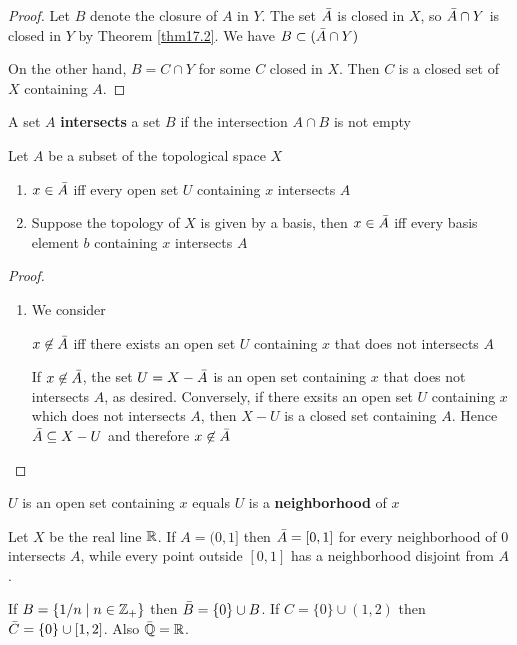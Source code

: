 \documentclass[11pt]{article}
\begin{document}
\begin{proof}
Let \(B\) denote the closure of \(A\) in \(Y\). The set \(\bar{A}\) is closed in \(X\),
so \(\bar{A}\cap Y\) is closed in \(Y\) by Theorem \ref{thm17.2}. We have \(B\subset(\bar{A}\cap Y)\)

On the other hand, \(B=C\cap Y\) for some \(C\) closed in \(X\). Then \(C\) is a closed set of \(X\)
containing \(A\).
\end{proof}

A set \(A\) \textbf{intersects} a set \(B\) if the intersection \(A\cap B\) is not empty

\begin{theorem}[]
\label{thm17.5}
Let \(A\) be a subset of the topological space \(X\)
\begin{enumerate}
\item \(x\in\bar{A}\) iff every open set \(U\) containing \(x\) intersects \(A\)
\item Suppose the topology of \(X\) is given by a basis, then \(x\in\bar{A}\) iff every basis
element \(b\) containing \(x\) intersects \(A\)
\end{enumerate}
\end{theorem}

\begin{proof}
\begin{enumerate}
\item We consider

\(x\not\in\bar{A}\) iff there exists an open set \(U\) containing \(x\) that does not
intersects \(A\)

If \(x\not\in\bar{A}\), the set \(U=X-\bar{A}\) is an open set containing \(x\) that does not
intersects \(A\), as desired. Conversely, if there exsits an open set \(U\) containing \(x\)
which does not intersects \(A\), then \(X-U\) is a closed set containing \(A\).
Hence \(\bar{A}\subseteq X-U\) and therefore \(x\not\in\bar{A}\)
\end{enumerate}
\end{proof}

\(U\) is an open set containing \(x\) equals \(U\) is a \textbf{neighborhood} of \(x\)

\begin{examplle}[]
Let \(X\) be the real line \(\mathbb{R}\). If \(A=(0,1]\) then \(\bar{A}=[0,1]\) for every neighborhood
of \(0\) intersects \(A\), while every point outside \([0,1]\) has a neighborhood disjoint
from \(A\).

If \(B=\{1/n\mid n\in\mathbb{Z}_+\}\) then \(\bar{B}=\{0\}\cup B\). If \(C=\{0\}\cup(1,2)\) then \(\bar{C}=\{0\}\cup[1,2]\). Also \(\bar{\mathbb{Q}}=\mathbb{R}\).
\end{examplle}
\end{document}
